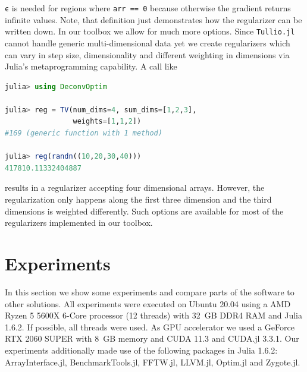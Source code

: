 \documentclass{juliacon}
\begin{document}
        \lstinline{ϵ} is needed for regions where \lstinline{arr == 0} because otherwise the gradient returns infinite values.
        Note, that definition just demonstrates how the regularizer can be written down.
        In our toolbox we allow for much more options. Since \verb|Tullio.jl| cannot handle generic multi-dimensional data yet
        we create regularizers which can vary in step size, dimensionality and
        different weighting in dimensions via Julia's metaprogramming capability.
        A call like 
        \begin{lstlisting}[language = Julia]
julia> using DeconvOptim

julia> reg = TV(num_dims=4, sum_dims=[1,2,3],
                weights=[1,1,2])
#169 (generic function with 1 method)

julia> reg(randn((10,20,30,40)))
417810.11332404887
        \end{lstlisting}
        results in a regularizer accepting four dimensional arrays. However, the regularization only happens along the first three dimension
        and the third dimensions is weighted differently.
        Such options are available for most of the regularizers implemented in our toolbox.

\section{Experiments}
    In this section we show some experiments and compare parts of the software to other solutions.
All experiments were executed on Ubuntu 20.04 using a AMD Ryzen 5 5600X 6-Core processor (12 threads) with \SI{32}{GB} DDR4 RAM and Julia 1.6.2.
    If possible, all threads were used.
    As GPU accelerator we used a GeForce RTX 2060 SUPER with \SI{8}{GB} memory and CUDA 11.3 and CUDA.jl 3.3.1.
    Our experiments additionally made use of the following packages in Julia 1.6.2: ArrayInterface.jl\cite{DifferentialEquations.jl-2017}, 
    BenchmarkTools.jl\cite{BenchmarkTools.jl-2016}, FFTW.jl\cite{FFTW05}, LLVM.jl\cite{LLVM.jl-2017}, Optim.jl\cite{mogensen2018optim}
    and  Zygote.jl\cite{Zygote.jl-2018}. 
\end{document}
